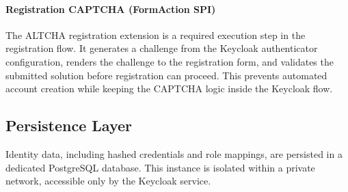 \paragraph{Registration CAPTCHA (FormAction SPI)}
The ALTCHA registration extension is a required execution step in the registration flow. 
It generates a challenge from the Keycloak authenticator configuration, renders the challenge to the registration form, and validates the submitted solution before registration can proceed. 
This prevents automated account creation while keeping the CAPTCHA logic inside the Keycloak flow.

\subsection{Persistence Layer}
Identity data, including hashed credentials and role mappings, are persisted in a dedicated PostgreSQL database. This instance is isolated within a private network, accessible only by the Keycloak service.





